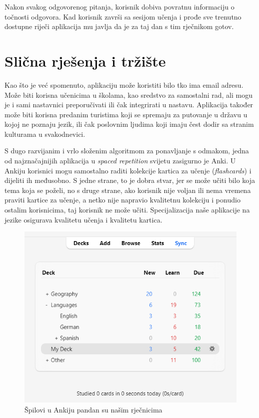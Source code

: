 Nakon svakog odgovorenog pitanja, korisnik dobiva povratnu informaciju o točnosti odgovora. Kad korisnik završi sa 
sesijom učenja i prođe sve trenutno dostupne riječi aplikacija mu javlja da je za taj dan s tim rječnikom gotov. 

\eject

\section{Slična rješenja i tržište}

Kao što je već spomenuto, aplikaciju može koristiti bilo tko ima email adresu. Može biti korisna učenicima u školama, 
kao sredstvo za samostalni rad, ali mogu je i sami nastavnici preporučivati ili čak integrirati u nastavu. Aplikacija također može biti 
korisna predanim turistima koji se spremaju za putovanje u državu u kojoj ne poznaju jezik, ili čak poslovnim ljudima koji imaju čest dodir 
sa stranim kulturama u svakodnevici. 

S dugo razvijanim i vrlo složenim algoritmom za ponavljanje s odmakom, jedna od najznačajnijih aplikacija u \textit{spaced repetition} svijetu zasigurno je Anki. U Ankiju korisnici mogu samostalno 
raditi kolekcije kartica za učenje (\textit{flashcards}) i dijeliti ih međusobno. S jedne strane, to je dobra stvar, jer se može učiti bilo koja tema koja 
se poželi, no s druge strane, ako korisnik nije voljan ili nema vremena praviti kartice za učenje, a netko nije napravio kvalitetnu kolekciju i 
ponudio ostalim korisnicima, taj korisnik ne može učiti. Specijalizacija naše aplikacije na jezike osigurava kvalitetu učenja i kvalitetu kartica.

\begin{figure}[H]
	\includegraphics[scale=0.8]{slike/anki_screen.png} 
	\centering
	\caption{Špilovi u Ankiju pandan su našim rječnicima}
	\label{fig:ankideck}
\end{figure}

\eject